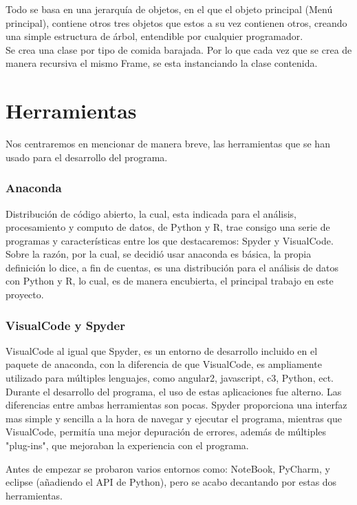 Todo se basa en una  jerarquía de objetos, en el que el objeto principal (Menú principal), contiene otros tres objetos que estos a su vez contienen otros, creando una simple estructura de árbol, entendible por cualquier programador. \\

Se crea una clase por tipo de comida barajada. Por lo que cada vez que se crea de manera recursiva el mismo Frame, se esta instanciando la clase contenida.

\section{Herramientas}
 Nos centraremos en mencionar de manera breve, las herramientas que se han usado para el desarrollo del programa.
\subsubsection{Anaconda}
Distribución de código abierto, la cual, esta indicada para el análisis, procesamiento y computo de datos, de Python y R, trae consigo una serie de programas y características entre los que destacaremos: Spyder y VisualCode.\\

Sobre la razón, por la cual, se decidió usar anaconda es básica, la propia definición lo dice, a fin de cuentas, es una distribución para el análisis de datos con Python y R, lo cual, es de manera encubierta, el principal trabajo en este proyecto.
\subsubsection{VisualCode y Spyder}
VisualCode al igual que Spyder, es un entorno de desarrollo incluido en el paquete de anaconda, con la diferencia de que VisualCode, es ampliamente utilizado  para múltiples lenguajes,  como angular2, javascript, c3, Python, ect.\\

Durante el desarrollo del programa, el uso de estas aplicaciones fue alterno. Las diferencias entre ambas herramientas son pocas. Spyder proporciona una interfaz mas simple y sencilla a la hora de navegar y ejecutar el programa, mientras que VisualCode, permitía una mejor depuración de errores, además de múltiples "plug-ins", que mejoraban la experiencia con el programa.

Antes de empezar se probaron varios entornos como: NoteBook, PyCharm, y eclipse (añadiendo el API de Python), pero se acabo decantando por estas dos herramientas.\\

